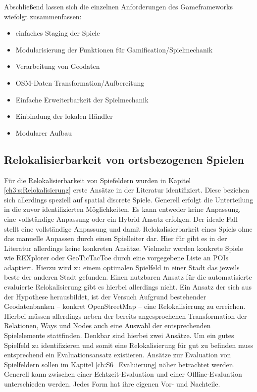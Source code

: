 Abschließend lassen sich die einzelnen Anforderungen des Gameframeworks wiefolgt zusammenfassen:

\begin{itemize}
\item einfaches Staging der Spiele
\item Modularisierung der Funktionen für Gamification/Spielmechanik
\item Verarbeitung von Geodaten
\item OSM-Daten Transformation/Aufbereitung
\item Einfache Erweiterbarkeit der Spielmechanik
\item Einbindung der lokalen Händler
\item Modularer Aufbau
\end{itemize}


\subsection*{Relokalisierbarkeit von ortsbezogenen Spielen}

Für die Relokalisierbarkeit von Spiefeldern wurden in Kapitel \ref{ch3:s:Relokalisierung} erste Ansätze in der Literatur identifiziert. Diese beziehen sich allerdings speziell auf spatial discrete Spiele.
Generell erfolgt die Unterteilung in die zuvor identifizierten Möglichkeiten.
Es kann entweder keine Anpassung, eine vollständige Anpassung oder ein Hybrid Ansatz erfolgen. Der ideale Fall stellt eine vollständige Anpassung und damit Relokalisierbarkeit eines Spiels ohne das manuelle Anpassen durch einen Spielleiter dar. Hier für gibt es in der Literatur allerdings keine konkreten Ansätze. Vielmehr werden konkrete Spiele wie REXplorer \cite{Ballagas.2007} oder GeoTicTacToe \cite{Kiefer.2007} durch eine vorgegebene Liste an POIs adaptiert. Hierzu wird zu einem optimalen Spielfeld in einer Stadt das jeweils beste der anderen Stadt gefunden.
Einen nutzbaren Ansatz für die automatisierte evaluierte Relokalisierung gibt es hierbei allerdings nicht.
Ein Ansatz der sich aus der Hypothese herausbildet, ist der Versuch Aufgrund bestehender Geodatenbanken -- konkret OpenStreetMap -- eine Relokalisierung zu erreichen. Hierbei müssen allerdings neben der bereits angesprochenen Transformation der Relationen, Ways und Nodes auch eine Auswahl der entsprechenden Spielelemente stattfinden. Denkbar sind hierbei zwei Ansätze. Um ein \glqq gutes Spielfeld\grqq{} zu identifizieren und somit eine Relokalisierung für gut zu befinden muss entsprechend ein Evaluationsansatz existieren. Ansätze zur Evaluation von Spielfeldern sollen im Kapitel \ref{ch:S6_Evaluierung} näher betrachtet werden. Generell kann zwischen einer Echtzeit-Evaluation und einer Offline-Evaluation unterschieden werden. Jedes Form hat ihre eigenen Vor- und Nachteile.

